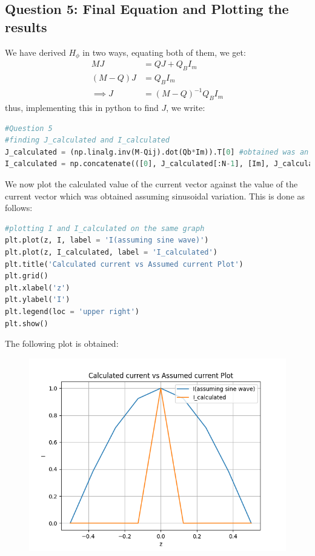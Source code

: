 \documentclass[11pt, a4paper]{article}
\begin{document}
\subsection{Question 5: Final Equation and Plotting the results}
We have derived $H_\phi$ in two ways, equating both of them, we get:
\begin{align*}
    MJ                & = QJ + Q_B I_m         \\
     (M - Q)J & = Q_B I_m              \\
    \implies J        & = (M - Q)^{-1} Q_B I_m
\end{align*}
thus, implementing this in python to find $J$, we write: \\
\begin{lstlisting}[language = Python]
#Question 5
#finding J_calculated and I_calculated
J_calculated = (np.linalg.inv(M-Qij).dot(Qb*Im)).T[0] #obtained was an array of array, thus taking the first element of the array
I_calculated = np.concatenate(([0], J_calculated[:N-1], [Im], J_calculated[N-1:], [0])) 


\end{lstlisting}

We now plot the calculated value of the current vector against the value of the current vector which was obtained assuming sinusoidal variation. This is done as follows: \\

\begin{lstlisting}[language = Python]
#plotting I and I_calculated on the same graph
plt.plot(z, I, label = 'I(assuming sine wave)')
plt.plot(z, I_calculated, label = 'I_calculated')
plt.title('Calculated current vs Assumed current Plot')
plt.grid()
plt.xlabel('z')
plt.ylabel('I')
plt.legend(loc = 'upper right')
plt.show()

\end{lstlisting}

The following plot is obtained:

\begin{figure}[H]
     \centering
     \includegraphics[scale=0.8]{Figure_1.png}
\end{figure}
\end{document}
